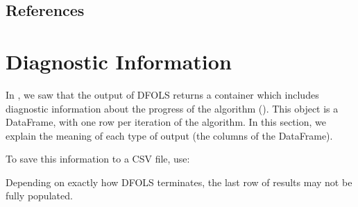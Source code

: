 \documentclass[letterpaper,10pt,english]{sphinxmanual}
\begin{document}
\section{References}
\label{\detokenize{advanced:references}}

\chapter{Diagnostic Information}
\label{\detokenize{diagnostic:diagnostic-information}}\label{\detokenize{diagnostic::doc}}
In {\hyperref[\detokenize{userguide::doc}]{}}, we saw that the output of DFO\sphinxhyphen{}LS returns a container which includes diagnostic information about the progress of the algorithm (). This object is a  DataFrame, with one row per iteration of the algorithm. In this section, we explain the meaning of each type of output (the columns of the DataFrame).

To save this information to a CSV file, use:
\begin{quote}

\begin{sphinxVerbatim}[commandchars=\\\{\}]

   

    

\end{sphinxVerbatim}
\end{quote}

Depending on exactly how DFO\sphinxhyphen{}LS terminates, the last row of results may not be fully populated.
\end{document}
